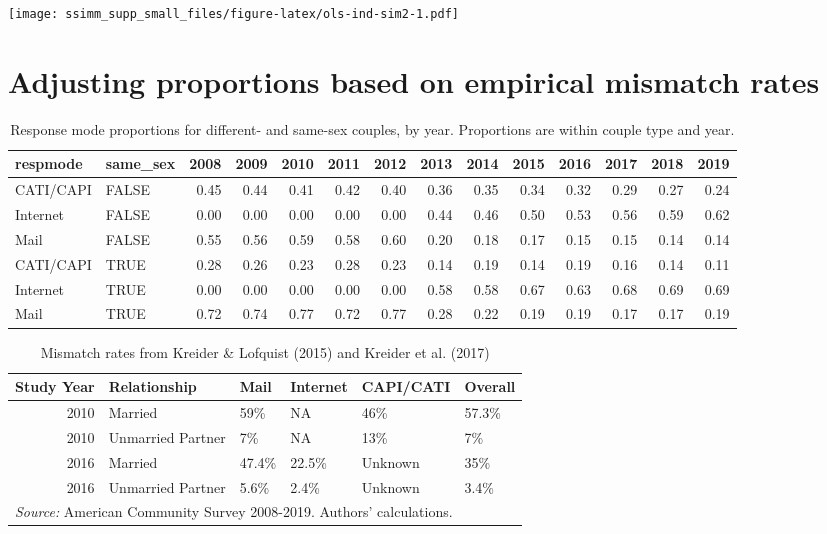 \documentclass[
  11pt,
]{article}
\begin{document}
\texttt{[image: ssimm\_supp\_small\_files/figure-latex/ols-ind-sim2-1.pdf]}

\newpage

\hypertarget{adjusting-proportions-based-on-empirical-mismatch-rates}{%
\section{Adjusting proportions based on empirical mismatch rates}\label{adjusting-proportions-based-on-empirical-mismatch-rates}}

\begin{table}

\caption{\label{tab:respmode}Response mode proportions for different- and same-sex couples, by year. Proportions are within couple type and year.}
\centering
\fontsize{9}{11}\selectfont
\begin{tabular}[t]{llrrrrrrrrrrrr}
\toprule
respmode & same\_sex & 2008 & 2009 & 2010 & 2011 & 2012 & 2013 & 2014 & 2015 & 2016 & 2017 & 2018 & 2019\\
\midrule
CATI/CAPI & FALSE & 0.45 & 0.44 & 0.41 & 0.42 & 0.40 & 0.36 & 0.35 & 0.34 & 0.32 & 0.29 & 0.27 & 0.24\\
Internet & FALSE & 0.00 & 0.00 & 0.00 & 0.00 & 0.00 & 0.44 & 0.46 & 0.50 & 0.53 & 0.56 & 0.59 & 0.62\\
Mail & FALSE & 0.55 & 0.56 & 0.59 & 0.58 & 0.60 & 0.20 & 0.18 & 0.17 & 0.15 & 0.15 & 0.14 & 0.14\\
CATI/CAPI & TRUE & 0.28 & 0.26 & 0.23 & 0.28 & 0.23 & 0.14 & 0.19 & 0.14 & 0.19 & 0.16 & 0.14 & 0.11\\
Internet & TRUE & 0.00 & 0.00 & 0.00 & 0.00 & 0.00 & 0.58 & 0.58 & 0.67 & 0.63 & 0.68 & 0.69 & 0.69\\
\addlinespace
Mail & TRUE & 0.72 & 0.74 & 0.77 & 0.72 & 0.77 & 0.28 & 0.22 & 0.19 & 0.19 & 0.17 & 0.17 & 0.19\\
\bottomrule
\end{tabular}
\end{table}

\begin{table}

\caption{\label{tab:mismatch}Mismatch rates from Kreider \& Lofquist (2015) and Kreider et al. (2017)}
\centering
\begin{tabular}[t]{rlllll}
\toprule
Study Year & Relationship & Mail & Internet & CAPI/CATI & Overall\\
\midrule
2010 & Married & 59\% & NA & 46\% & 57.3\%\\
2010 & Unmarried Partner & 7\% & NA & 13\% & 7\%\\
2016 & Married & 47.4\% & 22.5\% & Unknown & 35\%\\
2016 & Unmarried Partner & 5.6\% & 2.4\% & Unknown & 3.4\%\\
\bottomrule
\multicolumn{6}{l}{\rule{0pt}{1em}\textit{Source:} American Community Survey 2008-2019. Authors' calculations.}\\
\end{tabular}
\end{table}
\end{document}

